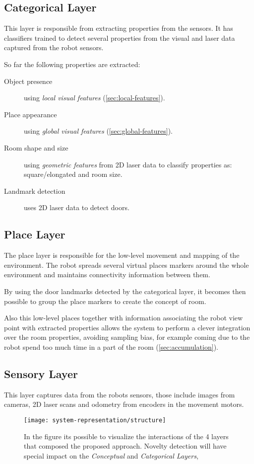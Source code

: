 \subsection{Categorical Layer}
This layer is responsible from extracting properties from the sensors.
It has classifiers trained to detect several properties from the visual and laser data captured from the robot sensors.

So far the following properties are extracted:
\begin{description}
\item[Object presence] using \emph{local visual features} (\autoref{sec:local-features}).
\item[Place appearance] using \emph{global visual features} (\autoref{sec:global-features}).
\item[Room shape and size] using \emph{geometric features} from 2D laser data to classify properties as: square/elongated and room size.
\item[Landmark detection] uses 2D laser data to detect doors.
\end{description}


\subsection{Place Layer}
The place layer is responsible for the low-level movement and mapping of the environment.
The robot spreads several virtual places markers around the whole environment and maintains connectivity information between them.

By using the door landmarks detected by the categorical layer, it becomes then possible to group the place markers to create the concept of room.

Also this low-level places together with information associating the robot view point with extracted properties allows the system to perform a clever integration over the room properties, avoiding sampling bias, for example coming due to the robot spend too much time in a part of the room (\autoref{sec:accumulation}).

\subsection{Sensory Layer}
This layer captures data from the robots sensors, those include images from cameras, 2D laser scans and odometry from encoders in the movement motors.


\begin{figure}[h]
\texttt{[image: system-representation/structure]}
\caption{In the figure its possible to visualize the interactions of the 4 layers that composed the proposed approach. Novelty detection will have special impact on the \emph{Conceptual} and \emph{Categorical Layers},}
\label{fig:system-structure}
\end{figure}



